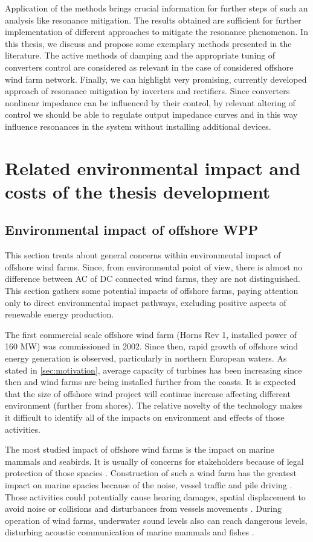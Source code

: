 \documentclass[a4paper,11pt,oneside]{report} %
\begin{document}
Application of the methods brings crucial information for further steps of such an analysis like resonance mitigation. The results obtained are sufficient for further implementation of different approaches to mitigate the resonance phenomenon. In this thesis, we discuss and propose some exemplary methods presented in the literature. The active methods of damping and the appropriate tuning of converters control are considered as relevant in the case of considered offshore wind farm network. Finally, we can highlight very promising, currently developed approach of resonance mitigation by inverters and rectifiers. Since converters nonlinear impedance can be influenced by their control, by relevant altering of control we should be able to regulate output impedance curves and in this way influence resonances in the system without installing additional devices.

\chapter{Related environmental impact and costs of the thesis development}
\section{Environmental impact of offshore WPP}
This section treats about general concerns within environmental impact of offshore wind farms. Since, from environmental point of view, there is almost no difference between AC of DC connected wind farms, they are not distinguished. This section gathers some potential impacts of offshore farms, paying attention only to direct environmental impact pathways, excluding positive aspects of renewable energy production.

The first commercial scale offshore wind farm (Horns Rev 1, installed power of 160 MW) was commissioned in 2002. Since then, rapid growth of offshore wind energy generation is observed, particularly in northern European waters. As stated in \ref{sec:motivation}, average capacity of turbines has been increasing since then and wind farms are being installed further from the coasts. It is expected that the size of offshore wind project will continue increase \cite{offshorestat2014} affecting different environment (further from shores). The relative novelty of the technology makes it difficult to identify all of the impacts on environment and effects of those activities.

The most studied impact of offshore wind farms is the impact on marine mammals and seabirds. It is usually of concerns for stakeholders because of legal protection of those spacies \cite{bailey2014}. Construction of such a wind farm has the greatest impact on marine spacies because of the noise, vessel traffic and pile driving \cite{dolman2010}. Those activities could potentially cause hearing damages, spatial displacement to avoid noise or collisions and disturbances from vessels movements \cite{madsen2006}.  During operation of wind farms, underwater sound levels also can reach dangerous levels, disturbing acoustic communication of marine mammals \cite{tougaard2009} and fishes \cite{wahlberg2005}. 
\end{document}
